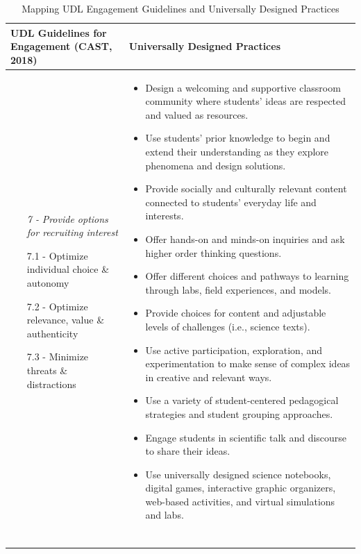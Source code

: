 \documentclass[11.5pt]{sig-alternate}
\begin{document}
\begin{large}
\begin{table}
\caption{Mapping UDL Engagement Guidelines and Universally Designed Practices}
\begin{tabular}{ll}
\hline
\centering UDL Guidelines for Engagement (CAST, 2018) & \centering Universally Designed Practices \\
\hline
\begin{enumerate}
    \item[\textit{7 - }] \textit{Provide options for recruiting interest}
    \item[7.1 - ] Optimize individual choice \& autonomy
    \item[7.2 - ] Optimize relevance, value \& authenticity
    \item[7.3 - ] Minimize threats \& distractions
\end{enumerate}
&
\begin{itemize}
    \item Design a welcoming and supportive classroom community where students’ ideas are respected and valued as resources.
    \item Use students’ prior knowledge to begin and extend their understanding as they explore phenomena and design solutions.
    \item Provide socially and culturally relevant content connected to students’ everyday life and interests.
    \item Offer hands-on and minds-on inquiries and ask higher order thinking questions.
    \item Offer different choices and pathways to learning through labs, field experiences, and models.
    \item Provide choices for content and adjustable levels of challenges (i.e., science texts).
    \item Use active participation, exploration, and experimentation to make sense of complex ideas in creative and relevant ways.
    \item Use a variety of student-centered pedagogical strategies and student grouping approaches.
    \item Engage students in scientific talk and discourse to share their ideas.
    \item Use universally designed science notebooks, digital games, interactive graphic organizers, web-based activities, and virtual simulations and labs.
\end{itemize} 
\\ \hline
\begin{enumerate}

\end{enumerate}
\end{tabular}
\end{table}
\end{large}
\end{document}
